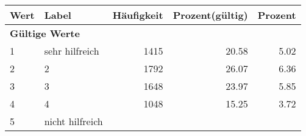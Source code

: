      \begin{longtable}{lXrrr}
     \toprule
     \textbf{Wert} & \textbf{Label} & \textbf{Häufigkeit} & \textbf{Prozent(gültig)} & \textbf{Prozent} \\
     \endhead
     \midrule
     \multicolumn{5}{l}{\textbf{Gültige Werte}}\\

     1 &
     \multicolumn{1}{X}{ sehr hilfreich   } &


       \num{1415} &
       \num[round-mode=places,round-precision=2]{20,58} &
         \num[round-mode=places,round-precision=2]{5,02} \\

     2 &
     \multicolumn{1}{X}{ 2   } &


       \num{1792} &
       \num[round-mode=places,round-precision=2]{26,07} &
         \num[round-mode=places,round-precision=2]{6,36} \\

     3 &
     \multicolumn{1}{X}{ 3   } &


       \num{1648} &
       \num[round-mode=places,round-precision=2]{23,97} &
         \num[round-mode=places,round-precision=2]{5,85} \\

     4 &
     \multicolumn{1}{X}{ 4   } &


       \num{1048} &
       \num[round-mode=places,round-precision=2]{15,25} &
         \num[round-mode=places,round-precision=2]{3,72} \\

     5 &
     \multicolumn{1}{X}{ nicht hilfreich   } &



\end{longtable}
